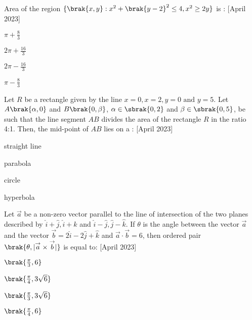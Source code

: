 \item Area of the region $\{\brak{x,y}:x^2+\brak{y-2}^2 \le 4,x^2 \ge 2y\}$ is : \hfill{[April 2023]}
\begin{enumerate}
    \begin{multicols}{4}
        \item $\pi+\frac{8}{3}$
        \item $2\pi+\frac{16}{3}$
        \item $2\pi-\frac{16}{3}$
        \item $\pi-\frac{8}{3}$
    \end{multicols}
\end{enumerate}
\bigskip
\item Let $R$ be a rectangle given by the line $x=0,x=2,y=0 \text{ and } y=5$. Let $A\brak{\alpha,0}$ and $B\brak{0,\beta}$, $\alpha \in \sbrak{0,2}$ and $\beta \in \sbrak{0,5}$, be such that the line segment $AB$ divides the area of the rectangle $R$ in the ratio 4:1. Then, the mid-point of $AB$ lies on a : \hfill{[April 2023]}
\begin{enumerate}
    \begin{multicols}{4}
        \item straight line
        \item parabola
        \item circle 
        \item hyperbola
    \end{multicols}
\end{enumerate}
\bigskip 
\item Let $\overset{\rightarrow}{a}$ be a non-zero vector parallel to the line of intersection of the two planes described by $\hat{i}+\hat{j},\hat{i}+\hat{k}$ and $\hat{i}-\hat{j},\hat{j}-\hat{k}$. If $\theta$ is the angle between the vector $\overset{\rightarrow}{a}$ and the vector $\overset{\rightarrow}{b}=2\hat{i}-2\hat{j}+\hat{k}$ and $\overset{\rightarrow}{a}\cdot\overset{\rightarrow}{b}=6$, then ordered pair $\brak{\theta,|\overset{\rightarrow}{a}\times\overset{\rightarrow}{b}|}$ is equal to: \hfill{[April 2023]}
\begin{enumerate}
    \begin{multicols}{4}
    \item $\brak{\frac{\pi}{3},6}$
    \item $\brak{\frac{\pi}{4},3\sqrt{6}}$
    \item $\brak{\frac{\pi}{3},3\sqrt{6}}$
        \item $\brak{\frac{\pi}{4},6}$
    \end{multicols}
\end{enumerate}
